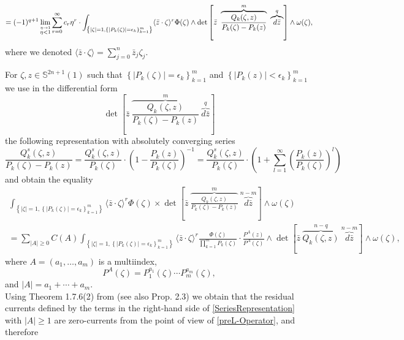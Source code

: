 \documentclass[11pt,reqno]{amsart}
\numberwithin{equation}{section}
\begin{document}
\begin{equation}\label{L-Sum-of-Determinants}
=(-1)^{q+1}\lim_{\stackrel{\eta\to 1}{\eta<1}}\sum_{r=0}^{\infty}
c_r\eta^r\cdot\int_{\left\{|\zeta|=1,\left\{|P_k(\zeta)|=\epsilon_k\right\}_{k=1}^m\right\}}
\langle{\bar z}\cdot\zeta\rangle^r\\
\Phi(\zeta)\wedge\det\left[{\bar z}\ \overbrace{\frac{Q_k(\zeta,z)}{P_k(\zeta)-P_k(z)}}^m\
\overbrace{d{\bar z}}^{q}\right]\wedge\omega(\zeta),
\end{equation}
where we denoted $\langle{\bar z}\cdot\zeta\rangle=\sum_{j=0}^n{\bar z}_j\zeta_j$.

\indent
For $\zeta,z\in {{\mathbb S}}^{2n+1}(1)$ such that $\left\{|P_k(\zeta)|=\epsilon_k\right\}_{k=1}^m$
and $\left\{|P_k(z)|<\epsilon_k\right\}_{k=1}^m$ we use in the differential form
$$\det\left[{\bar z}\ \overbrace{\frac{Q_k(\zeta,z)}{P_k(\zeta)-P_k(z)}}^{m}\
\overbrace{d{\bar z}}^{q}\right]$$
the following representation with absolutely converging series
\begin{equation}\label{QSeries}
\frac{Q^s_k(\zeta,z)}{P_k(\zeta)-P_k(z)}=\frac{Q^s_k(\zeta,z)}{P_k(\zeta)}
\cdot\left(1-\frac{P_k(z)}{P_k(\zeta)}\right)^{-1}
=\frac{Q^s_k(\zeta,z)}{P_k(\zeta)}\cdot\left(1+\sum_{l=1}^{\infty}
\left(\frac{P_k(z)}{P_k(\zeta)}\right)^l\right)
\end{equation}
and obtain the equality
\begin{multline}\label{SeriesRepresentation}
\int_{\left\{|\zeta|=1,\left\{|P_k(\zeta)|=\epsilon_k\right\}_{k=1}^m\right\}}
\langle{\bar z}\cdot\zeta\rangle^r\Phi(\zeta)
\times\det\left[{\bar z}\
\overbrace{\frac{Q_k(\zeta,z)}{P_k(\zeta)-P_k(z)}}^{m}\
\overbrace{d{\bar z}}^{n-m}\right]\wedge\omega(\zeta)\\
=\sum_{|A|\geq 0}C(A)
\int_{\left\{|\zeta|=1,\left\{|P_k(\zeta)|=\epsilon_k\right\}_{k=1}^m\right\}}
\langle{\bar z}\cdot\zeta\rangle^r\frac{\Phi(\zeta)}{\prod_{k=1}^mP_k(\zeta)}
\cdot\frac{P^A(z)}{P^A(\zeta)}
\wedge\det\left[{\bar z}\ \overbrace{Q_k(\zeta,z)}^{n-q}\
\overbrace{d{\bar z}}^{n-m}\right]\wedge\omega(\zeta),
\end{multline}
where $A=(a_1,\dots,a_m)$ is a multiindex,
$$P^A(\zeta)=P_1^{a_1}(\zeta)\cdots P_m^{a_m}(\zeta),$$
and $|A|=a_1+\cdots+a_m$.\\
\indent
Using Theorem 1.7.6(2) from \cite{CH} (see also \cite{HP3} Prop. 2.3) we obtain that the residual
currents defined by the terms in the right-hand side of \eqref{SeriesRepresentation} with $|A|\geq 1$
are zero-currents from the point of view of \eqref{preL-Operator}, and therefore
\end{document}
